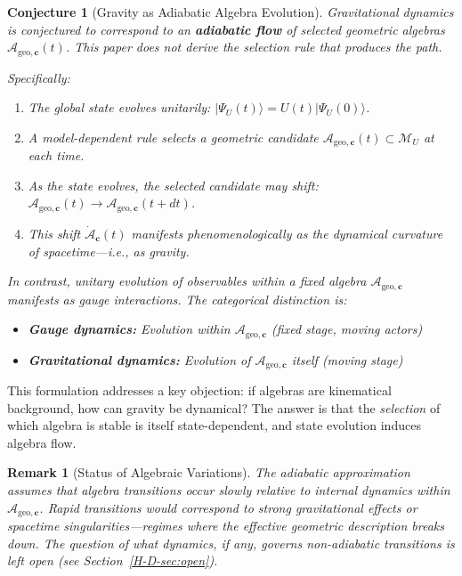 \documentclass[12pt,a4paper,openany]{book}
\newtheorem{remark}[theorem]{Remark}
\newtheorem{conjecture}[theorem]{Conjecture}
\begin{document}
\begin{conjecture}[Gravity as Adiabatic Algebra Evolution]
\label{H-D-conj:main}
Gravitational dynamics is conjectured to correspond to an \textbf{adiabatic flow} of selected geometric algebras $\mathcal{A}_{\mathrm{geo},\mathbf{c}}(t)$.  This paper does not derive the selection rule that produces the path.

Specifically:
\begin{enumerate}
    \item The global state evolves unitarily: $|\Psi_U(t)\rangle = U(t)|\Psi_U(0)\rangle$.
    \item A model-dependent rule selects a geometric candidate $\mathcal{A}_{\mathrm{geo},\mathbf{c}}(t)\subset\mathcal M_U$ at each time.
    \item As the state evolves, the selected candidate may shift: $\mathcal{A}_{\mathrm{geo},\mathbf{c}}(t) \to \mathcal{A}_{\mathrm{geo},\mathbf{c}}(t + dt)$.
    \item This shift $\dot{\mathcal{A}}_{\mathbf{c}}(t)$ manifests phenomenologically as the dynamical curvature of spacetime—i.e., as gravity.
\end{enumerate}

In contrast, unitary evolution of observables \emph{within} a fixed algebra $\mathcal{A}_{\mathrm{geo},\mathbf{c}}$ manifests as gauge interactions. The categorical distinction is:
\begin{itemize}
    \item \textbf{Gauge dynamics:} Evolution within $\mathcal{A}_{\mathrm{geo},\mathbf{c}}$ (fixed stage, moving actors)
    \item \textbf{Gravitational dynamics:} Evolution of $\mathcal{A}_{\mathrm{geo},\mathbf{c}}$ itself (moving stage)
\end{itemize}
\end{conjecture}

This formulation addresses a key objection: if algebras are kinematical background, how can gravity be dynamical? The answer is that the \emph{selection} of which algebra is stable is itself state-dependent, and state evolution induces algebra flow.

\begin{remark}[Status of Algebraic Variations]
The adiabatic approximation assumes that algebra transitions occur slowly relative to internal dynamics within $\mathcal{A}_{\mathrm{geo},\mathbf{c}}$. Rapid transitions would correspond to strong gravitational effects or spacetime singularities—regimes where the effective geometric description breaks down. The question of what dynamics, if any, governs non-adiabatic transitions is left open (see Section~\ref{H-D-sec:open}).
\end{remark}
\end{document}
